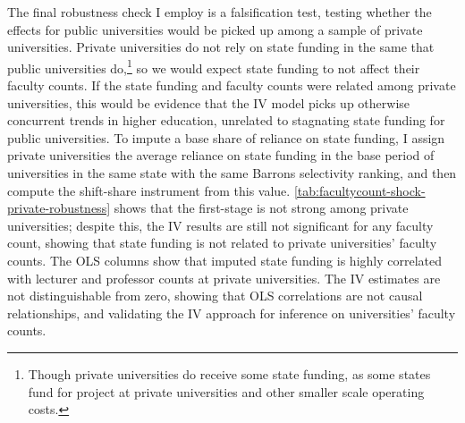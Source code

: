 The final robustness check I employ is a falsification test, testing whether the effects for public universities would be picked up among a sample of private universities.
Private universities do not rely on state funding in the same that public universities do,\footnote{
    Though private universities do receive some state funding, as some states fund for project at private universities and other smaller scale operating costs.
}
so we would expect state funding to not affect their faculty counts.
If the state funding and faculty counts were related among private universities, this would be evidence that the IV model picks up otherwise concurrent trends in higher education, unrelated to stagnating state funding for public universities.
To impute a base share of reliance on state funding, I assign private universities the average reliance on state funding in the base period of universities in the same state with the same Barrons selectivity ranking, and then compute the shift-share instrument from this value.
\autoref{tab:facultycount-shock-private-robustness} shows that the first-stage is not strong among private universities; despite this, the IV results are still not significant for any faculty count, showing that state funding is not related to private universities' faculty counts.
The OLS columns show that imputed state funding is highly correlated with lecturer and professor counts at private universities.
The IV estimates are not distinguishable from zero, showing that OLS correlations are not causal relationships, and validating the IV approach for inference on universities' faculty counts.
